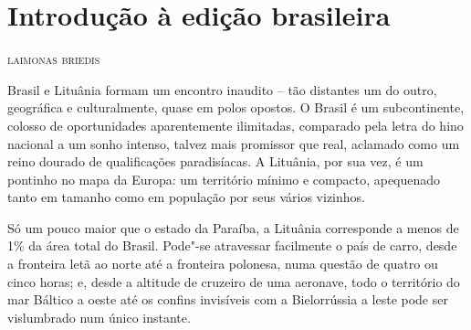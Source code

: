 \chapter[Introdução à edição brasileira]{Introdução à edição brasileira }

\begin{flushright}
\textsc{laimonas briedis}
\end{flushright}

\setlength{\epigraphwidth}{.65\textwidth}
\begin{epigraphs} 

\bigskip

\end{epigraphs}


Brasil e Lituânia formam um encontro inaudito -- tão distantes um do
outro, geográfica e culturalmente, quase em polos opostos. O Brasil é um
subcontinente, colosso de oportunidades aparentemente ilimitadas,
comparado pela letra do hino nacional a um sonho intenso, talvez mais
promissor que real, aclamado como um reino dourado de qualificações
paradisíacas. A Lituânia, por sua vez, é um pontinho no mapa da Europa:
um território mínimo e compacto, apequenado tanto em tamanho como em
população por seus vários vizinhos. 

Só um pouco maior que o estado da
Paraíba, a Lituânia corresponde a menos de 1\% da área total do
Brasil. Pode"-se atravessar facilmente o país de carro, desde a fronteira
letã ao norte até a fronteira polonesa, numa questão de quatro ou cinco
horas; e, desde a altitude de cruzeiro de uma aeronave, todo o
território do mar Báltico a oeste até os confins invisíveis com a
Bielorrússia a leste pode ser vislumbrado num único instante.

